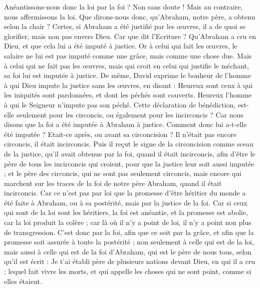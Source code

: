 \begin{multicols}{2}
Anéantissons-nous donc la loi par la foi ? Non sans doute ! Mais au contraire, nous affermissons la loi.
\VerseOne{}Que dirons-nous donc, qu'Abraham, notre père, a obtenu selon la chair ?
Certes, si Abraham a été justifié par les œuvres, il a de quoi se glorifier, mais non pas envers Dieu.
Car que dit l'Ecriture ? Qu’Abraham a cru en Dieu, et que cela lui a été imputé à justice.
Or à celui qui fait les œuvres, le salaire ne lui est pas imputé comme une grâce, mais comme une chose due.
Mais à celui qui ne fait pas les œuvres, mais qui croit en celui qui justifie le méchant, sa foi lui est imputée à justice.
De même, David exprime le bonheur de l'homme à qui Dieu impute la justice sans les œuvres, en disant :
Heureux sont ceux à qui les iniquités sont pardonnées, et dont les péchés sont couverts.
Heureux l'homme à qui le Seigneur n’impute pas son péché.
Cette déclaration de bénédiction, est-elle seulement pour les circoncis, ou également pour les incirconcis ? Car nous disons que la foi a été imputée à Abraham à justice.
Comment donc lui a-t-elle été imputée ? Etait-ce après, ou avant sa circoncision ? Il n’était pas encore circoncis, il était incirconcis.
Puis il reçut le signe de la circoncision comme sceau de la justice, qu’il avait obtenue par la foi, quand il était incirconcis, afin d’être le père de tous les incirconcis qui croient, pour que la justice leur soit aussi imputée ;
et le père des circoncis, qui ne sont pas seulement circoncis, mais encore qui marchent sur les traces de la foi de notre père Abraham, quand il était incirconcis.
Car ce n’est pas par loi que la promesse d'être héritier du monde a été faite à Abraham, ou à sa postérité, mais par la justice de la foi.
Car si ceux qui sont de la loi sont les héritiers, la foi est anéantie, et la promesse est abolie,
car la loi produit la colère ; car là où il n'y a point de loi, il n'y a point non plus de transgression.
C’est donc par la foi, afin que ce soit par la grâce, et afin que la promesse soit assurée à toute la postérité ; non seulement à celle qui est de la loi, mais aussi à celle qui est de la foi d’Abraham, qui est le père de nous tous,
selon qu'il est écrit : Je t'ai établi père de plusieurs nations devant Dieu, en qui il a cru ; lequel fait vivre les morts, et qui appelle les choses qui ne sont point, comme si elles étaient.

\end{multicols}
